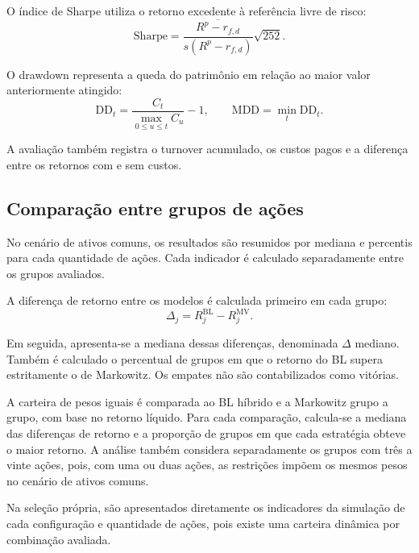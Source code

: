O índice de Sharpe utiliza o retorno excedente
à referência livre de risco:
\begin{equation}
\mathrm{Sharpe}
=
\frac{
\overline{R^p-r_{f,d}}
}{
s(R^p-r_{f,d})
}
\sqrt{252}.
\label{eq:sharpe_cap4}
\end{equation}

O drawdown representa a queda do patrimônio
em relação ao maior valor anteriormente atingido:
\begin{equation}
\mathrm{DD}_t
=
\frac{
C_t
}{
\max_{0\leq u\leq t}C_u
}
-1,
\qquad
\mathrm{MDD}
=
\min_t\mathrm{DD}_t.
\label{eq:drawdown_cap4}
\end{equation}

A avaliação também registra o turnover acumulado,
os custos pagos e a diferença entre os retornos
com e sem custos.

\subsection{Comparação entre grupos de ações}

No cenário de ativos comuns, os resultados
são resumidos por mediana e percentis para
cada quantidade de ações. Cada indicador
é calculado separadamente entre os grupos
avaliados.

A diferença de retorno entre os modelos
é calculada primeiro em cada grupo:
\begin{equation}
\Delta_j
=
R_j^{\mathrm{BL}}
-
R_j^{\mathrm{MV}}.
\label{eq:diferenca_grupo}
\end{equation}

Em seguida, apresenta-se a mediana dessas
diferenças, denominada $\Delta$ mediano.
Também é calculado o percentual de grupos
em que o retorno do BL supera estritamente
o de Markowitz. Os empates não são contabilizados
como vitórias.

A carteira de pesos iguais é comparada ao BL híbrido
e a Markowitz grupo a grupo, com base no retorno
líquido. Para cada comparação, calcula-se a mediana
das diferenças de retorno e a proporção de grupos
em que cada estratégia obteve o maior retorno.
A análise também considera separadamente os grupos
com três a vinte ações, pois, com uma ou duas ações,
as restrições impõem os mesmos pesos no cenário
de ativos comuns.

Na seleção própria, são apresentados diretamente
os indicadores da simulação de cada configuração
e quantidade de ações, pois existe uma carteira
dinâmica por combinação avaliada.